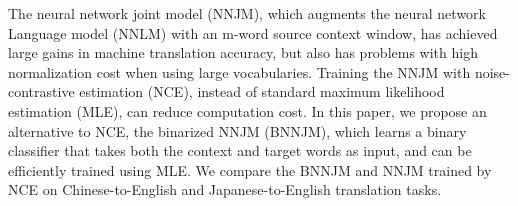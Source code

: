 The neural network joint model (NNJM), which augments the neural network Language model (NNLM) with an m-word source context window, has achieved large gains in machine translation accuracy, but also has problems with high normalization cost when using large vocabularies. Training the NNJM with noise-contrastive estimation (NCE), instead of standard maximum likelihood estimation (MLE), can reduce computation cost. In this paper, we propose an alternative to NCE, the binarized NNJM (BNNJM), which learns a binary classifier that takes both the context and target words as input, and can be efficiently trained using MLE. We compare the BNNJM and NNJM trained by NCE on Chinese-to-English and Japanese-to-English translation tasks.
